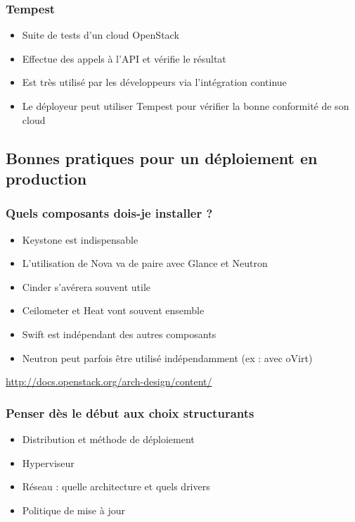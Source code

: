   \begin{frame}
    \frametitle{Tempest}
    \begin{itemize}
      \item Suite de tests d'un cloud OpenStack
      \item Effectue des appels à l'API et vérifie le résultat
      \item Est très utilisé par les développeurs via l'intégration continue
      \item Le déployeur peut utiliser Tempest pour vérifier la bonne conformité de son cloud
    \end{itemize}
  \end{frame}

  \subsection[Déployer en production]{Bonnes pratiques pour un déploiement en production}

  \begin{frame}
    \frametitle{Quels composants dois-je installer ?}
    \begin{itemize}
      \item Keystone est indispensable
      \item L'utilisation de Nova va de paire avec Glance et Neutron
      \item Cinder s'avérera souvent utile
      \item Ceilometer et Heat vont souvent ensemble
      \item Swift est indépendant des autres composants
      \item Neutron peut parfois être utilisé indépendamment (ex : avec oVirt)
    \end{itemize}
    \url{http://docs.openstack.org/arch-design/content/}
  \end{frame}

  \begin{frame}
    \frametitle{Penser dès le début aux choix structurants}
    \begin{itemize}
      \item Distribution et méthode de déploiement
      \item Hyperviseur
      \item Réseau : quelle architecture et quels drivers
      \item Politique de mise à jour
    \end{itemize}
  \end{frame}

